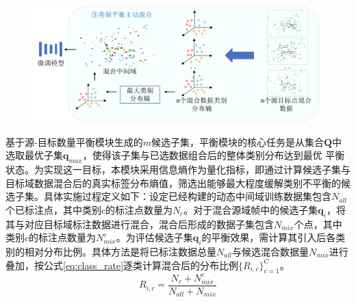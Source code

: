     \begin{figure}[H]
        \centering
        \includegraphics[width = \textwidth, scale=0.5]{ljx/figure/4-3am-b.pdf}
        \label{fig:4-3}
        \vspace{-0.6cm}
    \end{figure}
    基于源-目标数量平衡模块生成的$m$候选子集，平衡模块的核心任务是从集合$\mathbf{Q}$中选取最优子集$\mathbf{q}_{max}$，使得该子集与已选数据组合后的整体类别分布达到最优
    平衡状态。为实现这一目标，本模块采用信息熵作为量化指标，即通过计算候选子集与目标域数据混合后的真实标签分布熵值，筛选出能够最大程度缓解类别不平衡的候选子集。具体实施过程定义如下：设定已经构建的动态中间域训练数据集包含$N_{all}$个已标注点，其中类别$c$的标注点数量为$N_c$。对于混合源域帧中的候选子集$\mathbf{q}_i$，将其与对应目标域标注数据进行混合，混合后形成的数据子集包含$N_{mix}$个点，其中类别$c$的标注点数量为$N_{mix}^c$。为评估候选子集$\mathbf{q}_i$的平衡效果，需计算其引入后各类别的相对分布比例。具体方法是将已标注数据总量$N_{all}$与候选混合数据量$N_{mix}$进行叠加，按公式\eqref{eq:class_rate}逐类计算混合后的分布比例$\{R_{i,c}\}^C_{c=1}$。%
    \begin{equation}
        \label{eq:class_rate}
        R_{i,c} = \frac{N_c+N^c_{mix}}{N_{all}+N_{mix}}
    \end{equation}
